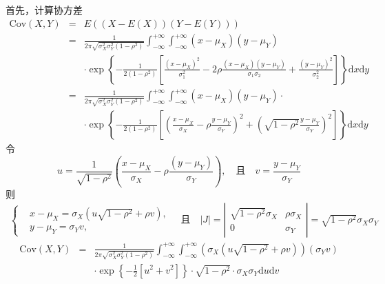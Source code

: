 \begin{solution}
    首先，计算协方差
\begin{eqnarray*}
\text{Cov}(X, Y) &=&E((X-E(X))(Y-E(Y)))\\
&=& \frac{1}{2 \pi \sqrt{\sigma_{X}^{2} \sigma_{Y}^{2}(1-\rho ^{2})}} \int_{-\infty}^{+\infty} \int_{-\infty}^{+\infty}\left(x-\mu_{X}\right)\left(y-\mu_{Y}\right) \\
&& \cdot \exp \left\{-\frac{1}{2\left(1-\rho^{2}\right)}\left[\frac{\left(x-\mu_{X}\right)^{2}}{\sigma_{1}^{2}}-2 \rho \frac{\left(x-\mu_{X}\right)\left(y-\mu_{Y}\right)}{\sigma_{1} \sigma_{2}}+\frac{\left(y-\mu_{Y}\right)^{2}}{\sigma_{2}^{2}}\right]\right\} \text{d} x \text{d} y \\
&=& \frac{1}{2 \pi \sqrt{\sigma_{X}^{2} \sigma_{Y}^{2}\left(1-\rho^{2}\right)}} \int_{-\infty}^{+\infty} \int_{-\infty}^{+\infty}\left(x-\mu_{X}\right)\left(y-\mu_{Y}\right)\cdot \\
&& \cdot  \exp \left\{-\frac{1}{2\left(1-\rho^{2}\right)}\left[\left(\frac{x-\mu_{X}}{\sigma_{X}}-\rho \frac{y-\mu_{Y}}{\sigma_{Y}}\right)^{2}+\left(\sqrt{1-\rho^{2}} \frac{y-\mu_{Y}}{\sigma_{Y}}\right)^{2}\right]\right\} \text{d} x \text{d} y
\end{eqnarray*}
令$$u=\frac{1}{\sqrt{1-\rho^{2}}}\left(\frac{x-\mu_{X}}{\sigma_{X}}-\rho  \frac{\left(y-\mu_{Y}\right)}{\sigma_{Y}}\right), \quad \text{且}\quad v=\frac{y-\mu_{Y}}{\sigma_{Y}}$$
则
\begin{eqnarray*}
\left\{\begin{aligned}
    &x-\mu_{X}=\sigma_{X}\left(u \sqrt{1-\rho^{2}}+\rho v\right),\\
    & y-\mu_{Y}=\sigma_{Y} v,
\end{aligned}\right.
 \quad \text{且}\quad
|J|=\left|\begin{matrix}
\sqrt{1-\rho^{2}} \sigma_{X} & \rho \sigma_{X} \\
0 & \sigma_{Y}
\end{matrix}\right|=\sqrt{1-\rho^{2}} \sigma_{X} \sigma_{Y} 
\end{eqnarray*}
\begin{eqnarray*}
\text{Cov}\left(X, Y\right)&=& \frac{1}{2 \pi \sqrt{\sigma_{X}^{2} \sigma_{Y}^{2}\left(1-\rho^{2}\right)}} \int_{-\infty}^{+\infty} \int_{-\infty}^{+\infty}\left(\sigma_{X}\left(u \sqrt{1-\rho^{2}}+\rho v\right)\right)\left(\sigma_{Y} v\right) \\
&& \cdot \exp \left\{-\frac{1}{2}\left[u^{2}+v^{2}\right]\right\} \cdot \sqrt{1-\rho^{2}} \cdot \sigma_{X} \sigma_{Y} \text{d} u \text{d} v \\

\end{eqnarray*}
\end{solution}
